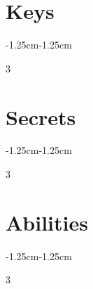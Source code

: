 \documentclass[a4paper, 12pt, finnish]{article}
\begin{document}
\newcommand{\nameSpacerG}[0]{\color{black}\Large{g}}
\newcommand{\nameSpacer}[0]{\makebox[0pt][l]{\nameSpacerG}}

\newcommand{\nameSize}[1]{\color{white}\small{ \textbf{#1}}}
\newcommand{\nameCommand}[1]{\nameSpacer\nameSize{#1}}

\newcommand{\emptyTable}[0]{
\begin{minipage}[b]{5cm}
\begin{center}
\begin{tabular}{ p{5cm} } 
 \
\end{tabular}
\end{center}
\end{minipage} \hfill
}

\newcommand{\cols}[1]{
\begin{adjustwidth}{-1.25cm}{-1.25cm}
\begin{multicols} {3}
#1
\end{multicols}
\end{adjustwidth}
}




\section{Keys}
\cols{\AllKey}
\pagebreak
\section{Secrets}
\cols{\AllSecret}
\pagebreak
\section{Abilities}
\cols{\AllAbility}
\end{document}
